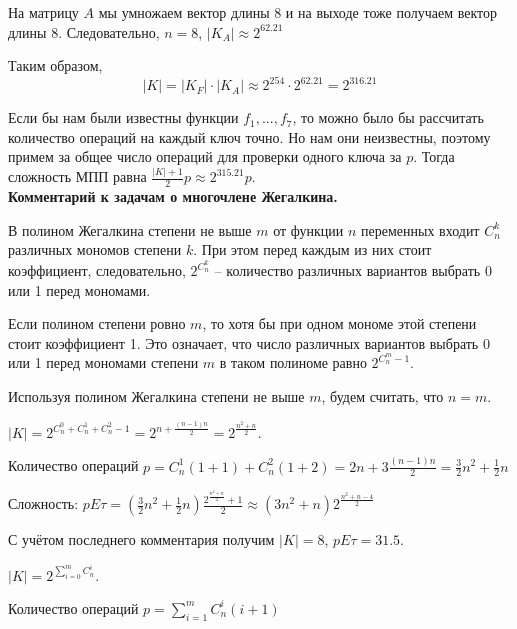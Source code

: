 \documentclass[letterpaper,11pt,openany]{book}
\begin{document}
На матрицу $A$ мы умножаем вектор длины 8 и на выходе тоже получаем вектор длины 8. Следовательно, $n = 8$, $|K_A| \approx 2^{62.21}$

\noindent Таким образом, 
$$|K| = |K_F| \cdot |K_A| \approx 2 ^ {254} \cdot 2 ^ {62.21} = 2 ^ {316.21}$$

Если бы нам были известны функции $f_1,...,f_7$, то можно было бы рассчитать количество операций на каждый ключ точно. Но нам они неизвестны, поэтому примем за общее число операций для проверки одного ключа за $p$. Тогда сложность МПП равна $\frac{|K| + 1}{2}p \approx 2 ^ {315.21} p.$ \\

\noindent \textbf{Комментарий к задачам о многочлене Жегалкина.}

В полином Жегалкина степени не выше $m$ от функции $n$ переменных входит $C_n ^ k$ различных мономов степени $k$. При этом перед каждым из них стоит коэффициент, следовательно, $2 ^ {C_n ^ k}$ -- количество различных вариантов выбрать 0 или 1 перед мономами.

Если полином степени ровно $m$, то хотя бы при одном мономе этой степени стоит коэффициент 1. Это означает, что число различных вариантов выбрать 0 или 1 перед мономами степени $m$ в таком полиноме равно $2 ^ {C_n ^ m - 1}$.

Используя полином Жегалкина степени не выше $m$, будем считать, что $n = m$.


\noindent $|K| = 2 ^ {C_n ^ 0 + C_n ^ 1 + C_n ^ 2 - 1} = 2 ^ {n + \frac{(n-1)n}{2}} = 2 ^ { \frac{n ^ 2 + n}{2} }.$

\noindent Количество операций $p = C_n ^ 1 (1 + 1) + C_n ^ 2 (1 + 2) = 2n + 3 \frac{(n-1)n}{2} = \frac{3}{2} n ^ 2 + \frac{1}{2} n$

\noindent Сложность: $pE\tau = (\frac{3}{2} n ^ 2 + \frac{1}{2} n) \frac{2 ^ { \frac{n ^ 2 + n}{2} } + 1}{2} \approx (3n ^ 2 + n) 2 ^ { \frac{n ^ 2 + n - 4}{2} }$

С учётом последнего комментария получим $|K| = 8$, $pE\tau = 31.5$.


\noindent $|K| = 2 ^ { \sum _{i = 0} ^ m C_n ^ i}.$

\noindent Количество операций $p = \sum _{i = 1} ^ m C_n ^ i (i + 1)$
\end{document}
